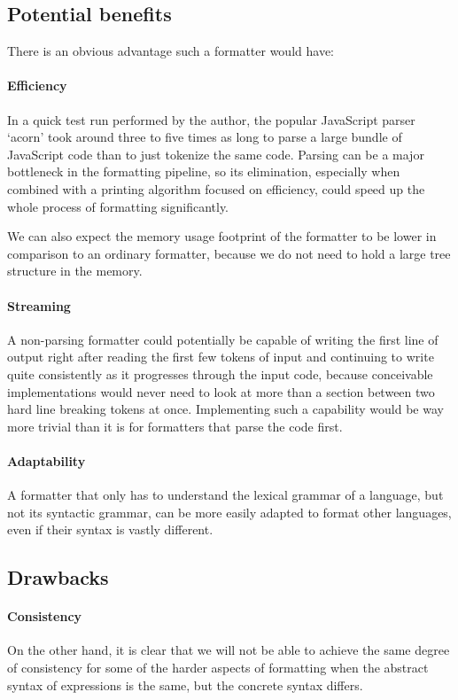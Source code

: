 \subsection{Potential benefits}
There is an obvious advantage such a formatter would have:

\paragraph{Efficiency}
In a quick test run performed by the author, the popular JavaScript parser `acorn'
took around three to five times as long to parse a large bundle of JavaScript code
than to just tokenize the same code.
Parsing can be a major bottleneck in the formatting pipeline,
so its elimination, especially when combined with a printing algorithm focused on efficiency,
could speed up the whole process of formatting significantly.

We can also expect the memory usage footprint of the formatter
to be lower in comparison to an ordinary formatter,
because we do not need to hold a large tree structure in the memory.

\paragraph{Streaming}
A non-parsing formatter could potentially be capable of writing the first line of output
right after reading the first few tokens of input and continuing to write quite consistently
as it progresses through the input code, because conceivable implementations would never
need to look at more than a section between two hard line breaking tokens at once.
Implementing such a capability would be way more trivial than it is for
formatters that parse the code first.

\paragraph{Adaptability}
A formatter that only has to understand the lexical grammar of a language,
but not its syntactic grammar, can be more easily adapted to format other languages,
even if their syntax is vastly different.

\subsection{Drawbacks}
\paragraph{Consistency}
On the other hand, it is clear that we will not be able to achieve the same degree of consistency
for some of the harder aspects of formatting
when the abstract syntax of expressions is the same,
but the concrete syntax differs.

